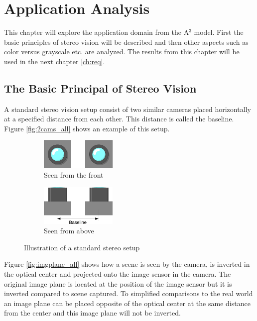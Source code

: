 \chapter{Application Analysis} \label{ch:appanalysis}
This chapter will explore the application domain from the A$^3$ model. First the basic principles of stereo vision will be described and then other aspects such as color versus grayscale etc. are analyzed. The results from this chapter will be used in the next chapter \vref{ch:req}.

\section{The Basic Principal of Stereo Vision}\label{sec:basicstereo}
A standard stereo vision setup consist of two similar cameras placed horizontally at a specified distance from each other. This distance is called the baseline. Figure \vref{fig:2cams_all} shows an example of this setup.\\
\begin{figure}[ht!]
  \centering
  \begin{subfigure}[t]{1\textwidth}
    \centering\includegraphics[width=0.4\textwidth]{figures/2cams_fro}
    \caption{Seen from the front\label{fig:2cams_fro}}
  \end{subfigure}\vspace{0.4cm}
  \begin{subfigure}[t]{1\textwidth}
    \centering\includegraphics[width=0.4\textwidth]{figures/2cams_top}
    \caption{Seen from above\label{fig:2cams_top}}
  \end{subfigure}
  \caption{Illustration of a standard stereo setup\label{fig:2cams_all}}
\end{figure}

Figure \vref{fig:imgplane_all} shows how a scene is seen by the camera, is inverted in the optical center and projected onto the image sensor in the camera. The original image plane is located at the position of the image sensor but it is inverted compared to scene captured. To simplified comparisons to the real world an image plane can be placed opposite of the optical center at the same distance from the center and this image plane will not be inverted.

